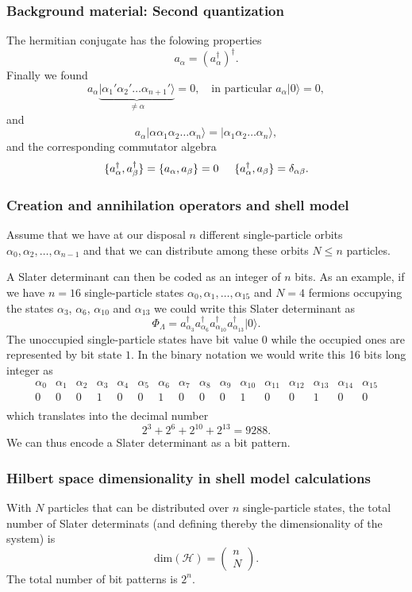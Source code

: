 \documentclass[compress]{beamer}
\newcommand*{\ket}[1]{|#1\rangle}
\begin{document}
\frame
{
  \frametitle{Background material: Second quantization}
\begin{small}
{\scriptsize
The hermitian conjugate has the folowing properties
\[
        a_{\alpha} = ( a_{\alpha}^\dagger )^\dagger.
\]
Finally we found 
\[
	a_\alpha\underbrace{\ket{\alpha_1'\alpha_2' \dots \alpha_{n+1}'}}_{\neq \alpha} = 0, \quad
		\textrm{in particular } a_\alpha \ket{0} = 0,
\]
and 
\[
 a_\alpha \ket{\alpha\alpha_1\alpha_2 \dots \alpha_{n}} = \ket{\alpha_1\alpha_2 \dots \alpha_{n}},
\]
and the corresponding commutator algebra
\[
	\{a_{\alpha}^\dagger,a_{\beta}^\dagger\} = \{a_{\alpha},a_{\beta}\} = 0 \hspace{0.5cm} 
\{a_\alpha^\dagger,a_\beta \} = \delta_{\alpha\beta}.
\]
}
\end{small}
}

\frame
{
  \frametitle{Creation and annihilation operators and shell model}
\begin{small}
{\scriptsize
Assume that we have at our disposal $n$ different single-particle orbits
$\alpha_0,\alpha_2,\dots,\alpha_{n-1}$ and that we can distribute  among these orbits $N\le n$ particles.

A Slater  determinant can then be coded as an integer of $n$ bits. As an example, if we have $n=16$ single-particle states
$\alpha_0,\alpha_1,\dots,\alpha_{15}$ and $N=4$ fermions occupying the states $\alpha_3$, $\alpha_6$, $\alpha_{10}$ and $\alpha_{13}$
we could write this Slater determinant as  
\[
\Phi_{\Lambda} = a_{\alpha_3}^\dagger a_{\alpha_6}^\dagger a_{\alpha_{10}}^\dagger a_{\alpha_{13}}^\dagger \ket{0}.
\]
The unoccupied single-particle states have bit value $0$ while the occupied ones are represented by bit state $1$. 
In the binary notation we would write this   16 bits long integer as
\[
\begin{array}{cccccccccccccccc}
{\alpha_0}&{\alpha_1}&{\alpha_2}&{\alpha_3}&{\alpha_4}&{\alpha_5}&{\alpha_6}&{\alpha_7} & {\alpha_8} &{\alpha_9} & {\alpha_{10}} &{\alpha_{11}} &{\alpha_{12}} &{\alpha_{13}} &{\alpha_{14}} & {\alpha_{15}} \\
{0} & {0} &{0} &{1} &{0} &{0} &{1} &{0} &{0} &{0} &{1} &{0} &{0} &{1} &{0} & {0} \\
\end{array}
\]
which translates into the decimal number
\[
2^3+2^6+2^{10}+2^{13}=9288.
\]
We can thus encode a Slater determinant as a bit pattern.
}
\end{small}
}

\frame
{
  \frametitle{Hilbert space dimensionality in shell model calculations}
\begin{small}
{\scriptsize
With $N$ particles that can be distributed over $n$ single-particle states, the total number of Slater determinats (and defining thereby the dimensionality of the system) is
\[
\mathrm{dim}(\mathcal{H}) = \left(\begin{array}{c} n \\N\end{array}\right).
\]
The total number of bit patterns is $2^n$. 
}
\end{small}
}
\end{document}
